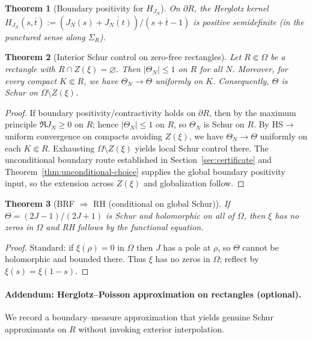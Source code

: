 \documentclass[11pt]{article}
\newtheorem{theorem}{Theorem}
\theoremstyle{definition}
\theoremstyle{remark}
\DeclareMathOperator{\dettwo}{det_2}
\begin{document}
\begin{theorem}[Boundary positivity for \(H_{J_N}\)]\label{thm:boundary-psd-formal}
On \(\partial R\), the Herglotz kernel \(H_{J_N}(s,\overline t):=(J_N(s)+\overline{J_N(t)})/(s+\overline t-1)\) is positive semidefinite (in the punctured sense along \(\Sigma_R\)).
\end{theorem}
\begin{theorem}[Interior Schur control on zero-free rectangles]\label{thm:UIC}
Let \(R\Subset\Omega\) be a rectangle with \(R\cap Z(\xi)=\varnothing\). Then \(|\Theta_N|\le 1\) on \(R\) for all \(N\). Moreover, for every compact \(K\Subset R\), we have \(\Theta_N\to\Theta\) uniformly on \(K\). Consequently, \(\Theta\) is Schur on \(\Omega\setminus Z(\xi)\).
\end{theorem}
\begin{proof}
If boundary positivity/contractivity holds on \(\partial R\), then by the maximum principle \(\Re J_N\ge0\) on \(R\); hence \(|\Theta_N|\le 1\) on \(R\), so \(\Theta_N\) is Schur on \(R\). By HS\(\to\)\(\dettwo\) uniform convergence on compacts avoiding \(Z(\xi)\), we have \(\Theta_N\to\Theta\) uniformly on each \(K\Subset R\). Exhausting \(\Omega\setminus Z(\xi)\) yields local Schur control there. The unconditional boundary route established in Section~\ref{sec:certificate} and Theorem~\ref{thm:unconditional-choice} supplies the global boundary positivity input, so the extension across \(Z(\xi)\) and globalization follow.
\end{proof}

\begin{theorem}[BRF \(\Rightarrow\) RH (conditional on global Schur)]\label{thm:brf-rh-final}
If \(\Theta=(2J-1)/(2J+1)\) is Schur and holomorphic on all of \(\Omega\), then \(\xi\) has no zeros in \(\Omega\) and RH follows by the functional equation.
\end{theorem}
\begin{proof}
Standard: if \(\xi(\rho)=0\) in \(\Omega\) then \(J\) has a pole at \(\rho\), so \(\Theta\) cannot be holomorphic and bounded there. Thus \(\xi\) has no zeros in \(\Omega\); reflect by \(\xi(s)=\xi(1-s)\).
\end{proof}

\paragraph{Addendum: Herglotz--Poisson approximation on rectangles (optional).}
We record a boundary--measure approximation that yields genuine Schur approximants on \(R\) without invoking exterior interpolation.
\end{document}
